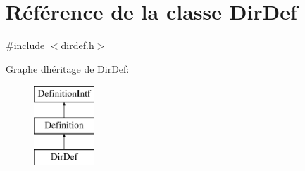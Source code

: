 \hypertarget{class_dir_def}{}\section{Référence de la classe Dir\+Def}
\label{class_dir_def}


{\ttfamily \#include $<$dirdef.\+h$>$}

Graphe d\textquotesingle{}héritage de Dir\+Def\+:\begin{figure}[H]
\begin{center}
\leavevmode
\includegraphics[height=3.000000cm]{class_dir_def}
\end{center}
\end{figure}
